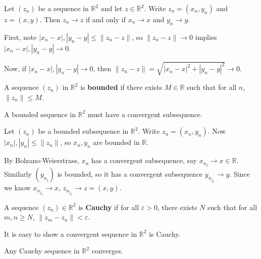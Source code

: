 \documentclass[12pt]{article}
\begin{document}
\begin{proposition}
	Let $(z_n)$ be a sequence in $\mathbb{R}^2$ and let $z \in \mathbb{R}^2$. Write $z_n = (x_n, y_n)$ and $z = (x, y)$. Then $z_n \to z$ if and only if $x_n \to x$ and $y_n \to y$.
\end{proposition}

\begin{proofbox}
First, note $|x_n - x|, |y_n - y| \leq \|z_n - z\|$, so $\|z_n - z\| \to 0$ implies $|x_n - x|, |y_n - y| \to 0$.

Now, if $|x_n - x|, |y_n - y| \to 0$, then $\|z_n - z\| = \sqrt{|x_n - x|^2 + |y_n - y|^2} \to 0$.
\end{proofbox}

\begin{definition}
	A sequence $(z_n)$ in $\mathbb{R}^2$ is \textbf{bounded} if there exists $M \in \mathbb{R}$ such that for all $n$, $\|z_n\| \leq M$.
\end{definition}

\begin{theorem}
\item
	A bounded sequence in $\mathbb{R}^2$ must have a convergent subsequence.
\end{theorem}

\begin{proofbox}
	Let $(z_n)$ be a bounded subsequence in $\mathbb{R}^2$. Write $z_n = (x_n, y_n)$. Now $|x_n|, |y_n| \leq \|z_n\|$, so $x_n, y_n$ are bounded in $\mathbb{R}$.

	By Bolzano-Weierstrass, $x_n$ has a convergent subsequence, say $x_{n_j} \to x \in \mathbb{R}$. Similarly $(y_{n_j})$ is bounded, so it has a convergent subsequence $y_{n_{j_k}} \to y$. Since we know $x_{n_{j_k}} \to x$, $z_{n_{j_k}} \to z = (x, y)$.
\end{proofbox}

\begin{definition}
	A sequence $(z_n) \in \mathbb{R}^2$ is \textbf{Cauchy} if for all $\varepsilon > 0$, there exists $N$ such that for all $m, n \geq N$, $\|z_m - z_n\| < \varepsilon$.
\end{definition}

It is easy to show a convergent sequence in $\mathbb{R}^2$ is Cauchy.

\begin{theorem}
\item
	Any Cauchy sequence in $\mathbb{R}^2$ converges.
\end{theorem}
\end{document}
